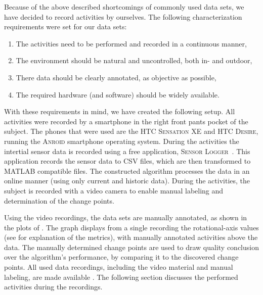 Because of the above described shortcomings of commonly used data sets, we have decided to record activities by ourselves.
The following characterization requirements were set for our data sets:
\begin{enumerate}
  \item The activities need to be performed and recorded in a continuous manner,
  \item The environment should be natural and uncontrolled, both in- and outdoor,
  \item There data should be clearly annotated, as objective as possible,
  \item The required hardware (and software) should be widely available.
\end{enumerate}

With these requirements in mind, we have created the following setup.
All activities were recorded by a smartphone in the right front pants pocket of the subject.
The phones that were used are the \textsc{HTC Sensation XE} and \textsc{HTC Desire}, running the \textsc{Anroid} smartphone operating system.
During the activities the intertial sensor data is recorded using a free application, \textsc{Sensor Logger}~\cite{sensorlogger}.
This application records the sensor data to \textsc{CSV} files, which are then transformed to \textsc{MATLAB} compatible files.
The constructed algorithm processes the data in an online manner (using only current and historic data).
During the activities, the subject is recorded with a video camera to enable manual labeling and determination of the change points.

Using the video recordings, the data sets are manually annotated, as shown in the plots of .
The graph displays from a single recording the rotational-axis values (see  for explanation of the metrics), with manually annotated activities above the data.
The manually determined change points are used to draw quality conclusion over the algorithm's performance, by comparing it to the discovered change points.
All used data recordings, including the video material and manual labeling, are made available \cite{vlasveld2013continuous}.
The following section discusses the performed activities during the recordings.
